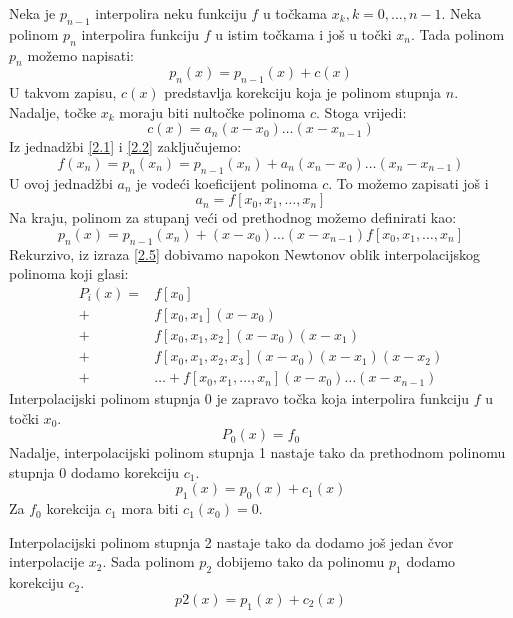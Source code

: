 \documentclass[12pt,a4paper]{report}
\begin{document}
	Neka je $p_{n-1}$ interpolira neku funkciju $f$ u točkama $x_k, k=0,\ldots,n-1$. Neka polinom $p_n$ interpolira funkciju $f$ u istim točkama i još u točki $x_n$. Tada polinom $p_n$ možemo napisati:
	\begin{equation}
		p_n(x)=p_{n-1}(x)+c(x)
		\label{2.1}
	\end{equation}
	U takvom zapisu, $c(x)$ predstavlja korekciju koja je polinom stupnja $n$. Nadalje, točke $x_k$ moraju biti nultočke polinoma $c$. Stoga vrijedi:
	\begin{equation}
		c(x)=a_n(x-x_0)\ldots(x-x_{n-1})
		\label{2.2}
	\end{equation}
	Iz jednadžbi \ref{2.1} i \ref{2.2} zaključujemo:
	\begin{equation}
		f(x_n)=p_n(x_n)=p_{n-1}(x_n)+a_n(x_n-x_0)\ldots(x_n-x_{n-1})
	\end{equation}
	U ovoj jednadžbi $a_n$ je vodeći koeficijent polinoma $c$. To možemo zapisati još i
	\begin{equation}
		a_n=f[x_0, x_1, \ldots, x_n]
	\end{equation}
	Na kraju, polinom za stupanj veći od prethodnog možemo definirati kao:
	\begin{equation}
		p_n(x)=p_{n-1}(x_n)+(x-x_0)\ldots(x-x_{n-1})f[x_0, x_1, \ldots, x_n]
		\label{2.5}
	\end{equation}
	Rekurzivo, iz izraza \ref{2.5} dobivamo napokon Newtonov oblik interpolacijskog polinoma koji glasi:
	\begin{align*}
	P_i(x)=&f[x_0]\\
	+&f[x_0,x_1](x-x_0)\\
	+&f[x_0,x_1,x_2](x-x_0)(x-x_1)\\
	+&f[x_0,x_1,x_2,x_3](x-x_0)(x-x_1)(x-x_2)\\
	+&\ldots+f[x_0,x_1,\ldots,x_n](x-x_0)\ldots(x-x_{n-1})
	\end{align*}
	Interpolacijski polinom stupnja 0 je zapravo točka koja interpolira funkciju $f$ u točki $x_0$.
	\begin{equation*}
		P_0(x)=f_0
	\end{equation*}
	Nadalje, interpolacijski polinom stupnja 1 nastaje tako da prethodnom polinomu stupnja 0 dodamo korekciju $c_1$.
	\begin{equation*}
		p_1(x)=p_0(x)+c_1(x)
	\end{equation*}
	Za $f_0$ korekcija $c_1$ mora biti $c_1(x_0)=0$. 
	
	Interpolacijski polinom stupnja 2 nastaje tako da dodamo još jedan čvor interpolacije $x_2$. Sada polinom $p_2$ dobijemo tako da polinomu $p_1$ dodamo korekciju $c_2$\cite{NumMatPrez}.
	\begin{equation*}
		p2(x)=p_1(x)+c_2(x)
	\end{equation*}
	
\end{document}
